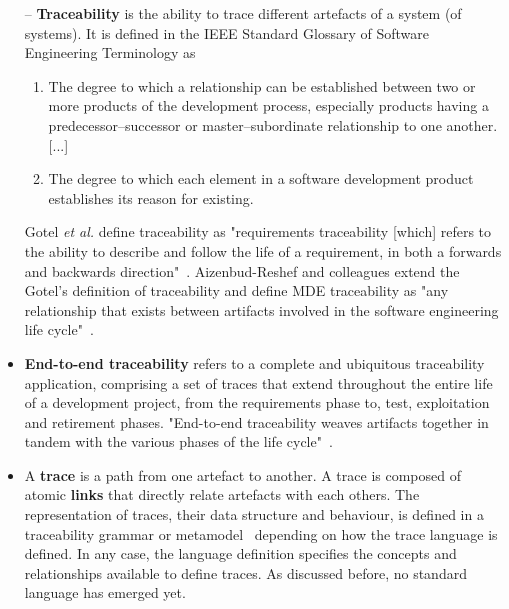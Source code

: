 \begin{itemize}
	\renewcommand\labelitemi{--}
	\item[--] \textbf{Traceability} is the ability to trace different artefacts of a system (of systems). It is defined in the IEEE Standard Glossary of Software Engineering Terminology \cite{ieeeglossary-se} as 
	\begin{enumerate}
		\item The degree to which a relationship can be established between two or more products of the development process, especially products having a predecessor–successor or master–subordinate relationship to one another. [...]
		\item The degree to which each element in a software development product establishes its reason for existing.
	\end{enumerate}
	Gotel \textit{et al.} define traceability as "requirements traceability [which]  refers  to  the  ability  to  describe and  follow  the life of a requirement, in both a forwards and backwards direction"~\cite{gotel1994}.
	Aizenbud-Reshef and colleagues extend the Gotel’s definition of traceability and define MDE
	traceability as "any relationship that exists between artifacts	involved in the software engineering life cycle"~\cite{aizenbud2006-model-traceability}.
	
	\item \textbf{{End-to-end traceability}} refers to a complete and ubiquitous traceability application, comprising a set of traces that extend throughout the entire life of a development project, from the requirements phase to, test, exploitation and retirement phases. "End-to-end traceability weaves artifacts together in tandem with the various phases of the life cycle"~\cite{asuncion2007-end-to-end-industrial}.
	
	\item A \textbf{trace} is a path from one artefact to another. A trace is composed of atomic \textbf{links} that directly relate artefacts with each others. The representation of traces, their data structure and behaviour, is defined in a traceability grammar or metamodel~\cite{drivalos2009-engineering-DSL-for-traceability} depending on how the trace language is defined. In any case, the language definition specifies the concepts and relationships available to define traces. As discussed before, no standard language has emerged yet. 
	

\end{itemize}
